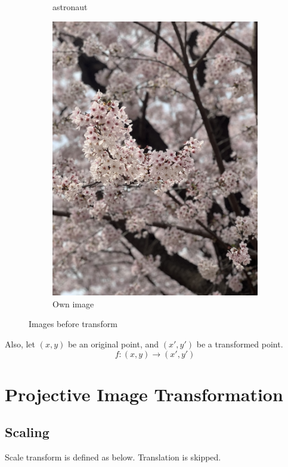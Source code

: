 \documentclass{article}
\begin{document}
\begin{figure}[!ht]
\begin{subfigure}{0.267\textwidth}
        \caption{astronaut}
    \end{subfigure}
    \begin{subfigure}{0.2\textwidth}
        \includegraphics[width=\textwidth]{./fig/cb.png}
        \caption{Own image}
    \end{subfigure}
    \caption{Images before transform}
\end{figure}

Also, let $(x, y)$ be an original point, and $(x', y')$ be a transformed point.
$$f : (x, y) \rightarrow (x', y')$$


\newpage
\section{Projective Image Transformation}

\subsection{Scaling}
Scale transform is defined as below. Translation is skipped.  
\end{document}
